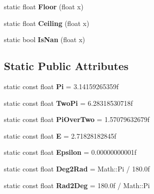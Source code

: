 \begin{DoxyCompactItemize}
\item 
\hypertarget{class_jade_1_1_math_1_1_math_acd68cb76d88b962d51b25332f7bea61d}{}static float {\bfseries Floor} (float x)\label{class_jade_1_1_math_1_1_math_acd68cb76d88b962d51b25332f7bea61d}

\item 
\hypertarget{class_jade_1_1_math_1_1_math_a75b2a6c69bce01a5e6949dc677b563de}{}static float {\bfseries Ceiling} (float x)\label{class_jade_1_1_math_1_1_math_a75b2a6c69bce01a5e6949dc677b563de}

\item 
\hypertarget{class_jade_1_1_math_1_1_math_a2208198c2e42102c6c5ccb11303a55c3}{}static bool {\bfseries Is\+Nan} (float x)\label{class_jade_1_1_math_1_1_math_a2208198c2e42102c6c5ccb11303a55c3}

\end{DoxyCompactItemize}
\subsection*{Static Public Attributes}
\begin{DoxyCompactItemize}
\item 
\hypertarget{class_jade_1_1_math_1_1_math_aa4783d6e94daa65971af2a6083aa0e34}{}static const float {\bfseries Pi} = 3.\+14159265359f\label{class_jade_1_1_math_1_1_math_aa4783d6e94daa65971af2a6083aa0e34}

\item 
\hypertarget{class_jade_1_1_math_1_1_math_a504d91ccd24079aac65abf030e624d33}{}static const float {\bfseries Two\+Pi} = 6.\+28318530718f\label{class_jade_1_1_math_1_1_math_a504d91ccd24079aac65abf030e624d33}

\item 
\hypertarget{class_jade_1_1_math_1_1_math_a1e7da29eb5899a70b57ee363ee376adc}{}static const float {\bfseries Pi\+Over\+Two} = 1.\+57079632679f\label{class_jade_1_1_math_1_1_math_a1e7da29eb5899a70b57ee363ee376adc}

\item 
\hypertarget{class_jade_1_1_math_1_1_math_af9a8a8c8fc5705196e27379f5191b732}{}static const float {\bfseries E} = 2.\+71828182845f\label{class_jade_1_1_math_1_1_math_af9a8a8c8fc5705196e27379f5191b732}

\item 
\hypertarget{class_jade_1_1_math_1_1_math_a7abe61f38af714e22baebd5d09aa7549}{}static const float {\bfseries Epsilon} = 0.\+00000000001f\label{class_jade_1_1_math_1_1_math_a7abe61f38af714e22baebd5d09aa7549}

\item 
\hypertarget{class_jade_1_1_math_1_1_math_ab14316866c81009fa35ce450b319b9e0}{}static const float {\bfseries Deg2\+Rad} = Math\+::\+Pi / 180.\+0f\label{class_jade_1_1_math_1_1_math_ab14316866c81009fa35ce450b319b9e0}

\item 
\hypertarget{class_jade_1_1_math_1_1_math_ac5850dc52c0c262a4fbfbd3652e68ccb}{}static const float {\bfseries Rad2\+Deg} = 180.\+0f / Math\+::\+Pi\label{class_jade_1_1_math_1_1_math_ac5850dc52c0c262a4fbfbd3652e68ccb}

\end{DoxyCompactItemize}


